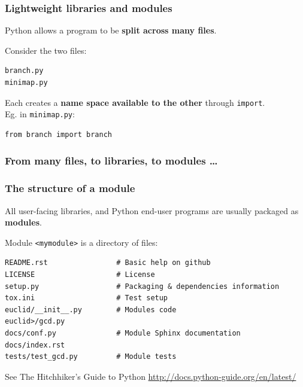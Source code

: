 \documentclass{beamer} %
\newcommand\emc[1]{\textcolor{midred}{\textbf{#1}}}
\begin{document}
\begin{frame}[fragile]

\frametitle{Lightweight libraries and modules}

Python allows a program to be \emc{split across many files}. 

\vspace{3mm}
Consider the two files:
\begin{verbatim}
branch.py
minimap.py
\end{verbatim}

\vspace{3mm}
Each creates a \emc{name space available to the other} through \texttt{import}. \\ Eg. in \texttt{minimap.py}:
\begin{verbatim}
from branch import branch
\end{verbatim}

\end{frame}

\begin{frame}

\frametitle{From many files, to libraries, to modules \ldots}

\end{frame}


\begin{frame}[fragile]

\frametitle{The structure of a module}

All user-facing libraries, and Python end-user programs are usually packaged as \emc{modules}.

\vspace{3mm}
Module \texttt{<mymodule>} is a directory of files:
\begin{small}
\begin{Verbatim}[fontsize=\footnotesize]
README.rst                # Basic help on github
LICENSE                   # License
setup.py                  # Packaging & dependencies information
tox.ini                   # Test setup
euclid/__init__.py        # Modules code
euclid>/gcd.py
docs/conf.py              # Module Sphinx documentation
docs/index.rst
tests/test_gcd.py         # Module tests
\end{Verbatim}
\end{small}

See The Hitchhiker’s Guide to Python \url{http://docs.python-guide.org/en/latest/}

\end{frame}
\end{document}
